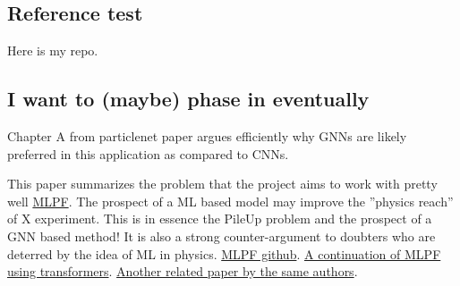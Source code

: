 \subsection*{Reference test}

Here is my repo. \cite{petren2026-msceng-ldmx-github}

\subsection*{I want to (maybe) phase in eventually}


Chapter A from particlenet paper \cite{qu2019-particlenet} argues efficiently why GNNs are likely preferred in this application as compared to CNNs. 

This paper summarizes the problem that the project aims to work with pretty well \href{https://arxiv.org/pdf/2101.08578}{MLPF}. The prospect of a ML based model may improve the ''physics reach'' of X experiment. This is in essence the PileUp problem and the prospect of a GNN based method! It is also a strong counter-argument to doubters who are deterred by the idea of ML in physics. \href{https://github.com/jpata/particleflow}{MLPF github}. \href{https://arxiv.org/pdf/2601.17554}{A continuation of MLPF using transformers}. \href{https://arxiv.org/pdf/2601.17554}{Another related paper by the same authors}.